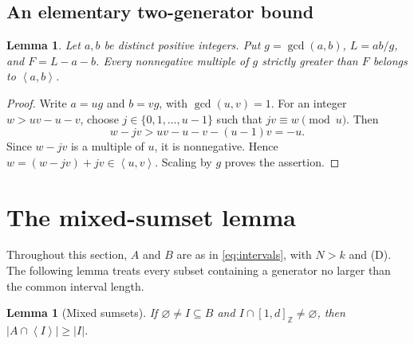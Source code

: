 \documentclass[11pt,a4paper]{article}
\numberwithin{equation}{section}
\newtheorem{lemma}[theorem]{Lemma}
\theoremstyle{remark}
\newcommand{\Z}{\mathbb Z}
\newcommand{\sg}[1]{\left\langle #1\right\rangle}
\newcommand{\Dcond}{\textup{(D)}}
\newcommand{\interval}[2]{[#1,#2]_{\Z}}
\begin{document}
\subsection{An elementary two-generator bound}

\begin{lemma}\label{lem:frobenius}
Let $a,b$ be distinct positive integers. Put
$g=\gcd(a,b)$, $L=ab/g$, and $F=L-a-b$.
Every nonnegative multiple of $g$ strictly greater than $F$ belongs
to $\sg{a,b}$.
\end{lemma}

\begin{proof}
Write $a=ug$ and $b=vg$, with $\gcd(u,v)=1$.
For an integer $w>uv-u-v$, choose
$j\in\{0,1,\ldots,u-1\}$ such that $jv\equiv w\pmod u$.
Then
\[
  w-jv>uv-u-v-(u-1)v=-u.
\]
Since $w-jv$ is a multiple of $u$, it is nonnegative.
Hence $w=(w-jv)+jv\in\sg{u,v}$.
Scaling by $g$ proves the assertion.
\end{proof}



\section{The mixed-sumset lemma}\label{sec:mixed}

Throughout this section, $A$ and $B$ are as in
\eqref{eq:intervals}, with $N>k$ and \Dcond.
The following lemma treats every subset containing a generator no
larger than the common interval length.

\begin{lemma}[Mixed sumsets]\label{lem:mixed}
If $\varnothing\ne I\subseteq B$ and $I\cap\interval{1}{d}\ne\varnothing$,
then $|A\cap\sg{I}|\ge|I|$.
\end{lemma}
\end{document}
